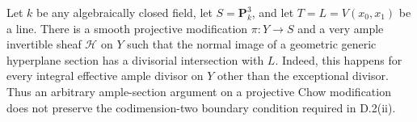 \begin{example}
\label{D:Chow-surface-boundary-obstruction}
Let $k$ be any algebraically closed field, let
$S=\mathbf P^3_k$, and let $T=L=V(x_0,x_1)$ be a line.
There is a smooth projective modification $\pi:Y\to S$ and a
very ample invertible sheaf $\mathcal H$ on $Y$ such that the
normal image of a geometric generic hyperplane section has a
divisorial intersection with $L$.  Indeed, this happens for
every integral effective ample divisor on $Y$ other than the
exceptional divisor.  Thus an arbitrary ample-section argument
on a projective Chow modification does not preserve the
codimension-two boundary condition required in D.2(ii).
\end{example}


